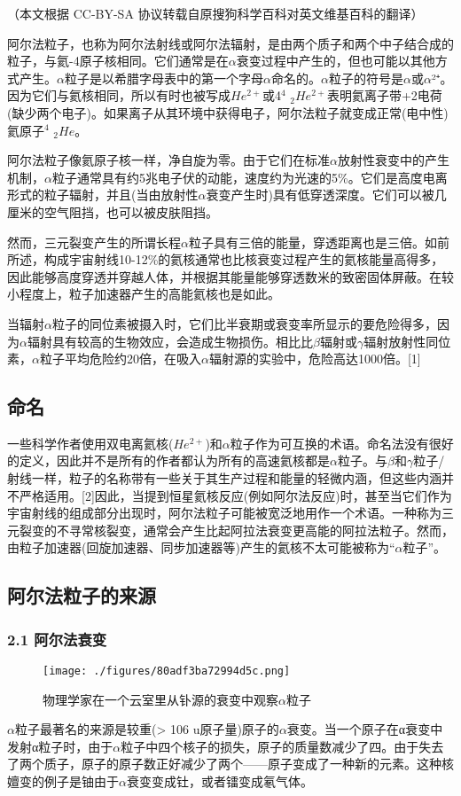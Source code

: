 
（本文根据 CC-BY-SA 协议转载自原搜狗科学百科对英文维基百科的翻译）

阿尔法粒子，也称为阿尔法射线或阿尔法辐射，是由两个质子和两个中子结合成的粒子，与氦-4原子核相同。它们通常是在$\alpha$衰变过程中产生的，但也可能以其他方式产生。$\alpha$粒子是以希腊字母表中的第一个字母$\alpha$命名的。$\alpha$粒子的符号是$\alpha$或$\alpha$²⁺。因为它们与氦核相同，所以有时也被写成$He^{2+}$或4$^4$ $_2He^{2+}$表明氦离子带+2电荷(缺少两个电子)。如果离子从其环境中获得电子，阿尔法粒子就变成正常(电中性)氦原子$^4$ $_2He$。

阿尔法粒子像氦原子核一样，净自旋为零。由于它们在标准$\alpha$放射性衰变中的产生机制，$\alpha$粒子通常具有约5兆电子伏的动能，速度约为光速的5\%。它们是高度电离形式的粒子辐射，并且(当由放射性$\alpha$衰变产生时)具有低穿透深度。它们可以被几厘米的空气阻挡，也可以被皮肤阻挡。

然而，三元裂变产生的所谓长程$\alpha$粒子具有三倍的能量，穿透距离也是三倍。如前所述，构成宇宙射线10-12\%的氦核通常也比核衰变过程产生的氦核能量高得多，因此能够高度穿透并穿越人体，并根据其能量能够穿透数米的致密固体屏蔽。在较小程度上，粒子加速器产生的高能氦核也是如此。

当辐射$\alpha$粒子的同位素被摄入时，它们比半衰期或衰变率所显示的要危险得多，因为$\alpha$辐射具有较高的生物效应，会造成生物损伤。相比比$\beta$辐射或$\gamma$辐射放射性同位素，$\alpha$粒子平均危险约20倍，在吸入$\alpha$辐射源的实验中，危险高达1000倍。[1]

\subsection{命名}
一些科学作者使用双电离氦核($He^{2+}$)和$\alpha$粒子作为可互换的术语。命名法没有很好的定义，因此并不是所有的作者都认为所有的高速氦核都是$\alpha$粒子。与$\beta$和$\gamma$粒子/射线一样，粒子的名称带有一些关于其生产过程和能量的轻微内涵，但这些内涵并不严格适用。[2]因此，当提到恒星氦核反应(例如阿尔法反应)时，甚至当它们作为宇宙射线的组成部分出现时，阿尔法粒子可能被宽泛地用作一个术语。一种称为三元裂变的不寻常核裂变，通常会产生比起阿拉法衰变更高能的阿拉法粒子。然而，由粒子加速器(回旋加速器、同步加速器等)产生的氦核不太可能被称为“$\alpha$粒子”。

\subsection{阿尔法粒子的来源}
\subsubsection{2.1 阿尔法衰变}
\begin{figure}[ht]
\centering
\texttt{[image: ./figures/80adf3ba72994d5c.png]}
\caption{物理学家在一个云室里从钋源的衰变中观察$\alpha$粒子} \label{fig_ALZ_1}
\end{figure}
$\alpha$粒子最著名的来源是较重(> 106 u原子量)原子的$\alpha$衰变。当一个原子在α衰变中发射α粒子时，由于$\alpha$粒子中四个核子的损失，原子的质量数减少了四。由于失去了两个质子，原子的原子数正好减少了两个——原子变成了一种新的元素。这种核嬗变的例子是铀由于$\alpha$衰变变成钍，或者镭变成氡气体。

